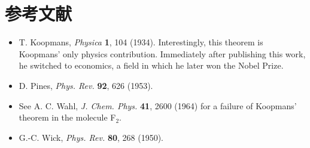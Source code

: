 \section*{参考文献}

\begin{itemize}[leftmargin=2em,itemsep=0pt,parsep=0pt,label={}]
\item [K1934] T. Koopmans, \textit{Physica} \textbf{1}, 104 (1934). Interestingly, this theorem is Koopmans' only physics contribution. Immediately after publishing this work, he switched to economics, a field in which he later won the Nobel Prize.
\item [P1953] D. Pines, \textit{Phys. Rev.} \textbf{92}, 626 (1953).
\item [W1964] See A. C. Wahl, \textit{J. Chem. Phys.} \textbf{41}, 2600 (1964) for a failure of Koopmans' theorem in the molecule F$_2$.
\item [W1950] G.-C. Wick, \textit{Phys. Rev.} \textbf{80}, 268 (1950).
\end{itemize}
